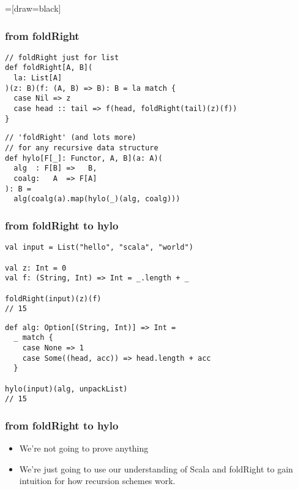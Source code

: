 \documentclass[include/preamble.tex]{subfiles}
\begin{document}
=[draw=black]

\begin{frame}[fragile]
  \frametitle{from foldRight }
  \begin{center}
    \begin{lstlisting}[style=scala]
// foldRight just for list
def foldRight[A, B](
  la: List[A]
)(z: B)(f: (A, B) => B): B = la match {
  case Nil => z
  case head :: tail => f(head, foldRight(tail)(z)(f))
}
    \end{lstlisting}
    \pause
    \hrulefill
    \begin{lstlisting}[style=scala]
// 'foldRight' (and lots more)
// for any recursive data structure
def hylo[F[_]: Functor, A, B](a: A)(
  alg  : F[B] =>   B,
  coalg:   A  => F[A]
): B =
  alg(coalg(a).map(hylo(_)(alg, coalg)))
    \end{lstlisting}
  \end{center}
\end{frame}

\begin{frame}[fragile]
  \frametitle{from foldRight to hylo}
  \begin{center}
    \begin{lstlisting}[style=scala]
val input = List("hello", "scala", "world")

val z: Int = 0
val f: (String, Int) => Int = _.length + _

foldRight(input)(z)(f)
// 15
    \end{lstlisting}
    \pause
    \hrulefill
    \begin{lstlisting}[style=scala]
def alg: Option[(String, Int)] => Int =
  _ match {
    case None => 1
    case Some((head, acc)) => head.length + acc
  }

hylo(input)(alg, unpackList)
// 15
    \end{lstlisting}
  \end{center}
\end{frame}

\begin{frame}[fragile]
  \frametitle{from foldRight to hylo}
  \begin{center}
    \begin{itemize}
    \item
      We're not going to prove anything
    \item
      We're just going to use our understanding of Scala and
      foldRight to gain intuition for how recursion schemes work.
    \end{itemize}
  \end{center}
\end{frame}
\end{document}
